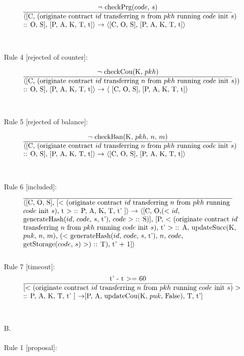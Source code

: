\documentclass[a4paper]{llncs}
\begin{document}
\begin{equation}{}
\frac{\text{$\neg$ checkPrg($code$, $s$)}}{\parbox{4.2in}{\text{$\langle$[C, (originate contract ${id}$ transferring  ${n}$ from ${pkh}$ running ${code}$ init ${s}$)} \text{:: O, S], [P, A, K, T, t]$\rangle$ $\rightarrow$ $\langle$[C, O, S],} \text{[P, A, K, T, t]$\rangle$}}} 
\end{equation}
\\
\\
Rule 4 [rejected of counter]:

\begin{equation}{}
\frac{\text{$\neg$ checkCou(K, $pkh$)}}{\parbox{4.2in}{\text{$\langle$[C, (originate contract ${id}$ transferring  ${n}$ from ${pkh}$ running ${code}$ init ${s}$))} \text{:: O, S], [P, A, K, T, t]$\rangle$ $\rightarrow$ $\langle$ [C, O, S],} \text{[P, A, K, T, t]$\rangle$}}} 
\end{equation}
\\
\\
Rule 5 [rejected of balance]:

\begin{equation}{}
\frac{\text{$\neg$ checkBan(K, $pkh$, $n$, $m$)}}{\parbox{4.2in}{\text{$\langle$[C, (originate contract ${id}$ transferring  ${n}$ from ${pkh}$ running ${code}$ init ${s}$)} \text{:: O, S], [P, A, K, T, t]$\rangle$ $\rightarrow$ $\langle$[C, O, S],} \text{[P, A, K, T, t]$\rangle$}}} 
\end{equation}
\\
\\
Rule 6 [included]:
\begin{equation}{}
\frac{}{\parbox{4.2in}{\text{$\langle$[C, O, S], [$<$ (originate contract ${id}$ transferring  ${n}$ from ${pkh}$ running } \\
\text{${code}$ init ${s}$), t $>$ :: P, A, K, T, t' ]$\rangle$ $\rightarrow$ $\langle$[C, O,($<$ $id$, } \\
\text{generateHash($id$, $code$, $s$, t'), $code$ $>$ :: S)], [P, $<$ (originate contract ${id}$ } \\
\text{transferring  ${n}$ from ${pkh}$ running ${code}$ init ${s}$), t' $>$ :: A, updateSucc(K, } \\
\text{$puk$, $n$, $m$), ($<$ generateHash($id$, $code$, $s$, t'), $n$, $code$, } \\
 \text{getStorage($code$, $s$) $>$) :: T), t' + 1]$\rangle$}}} 
\end{equation}
\\
Rule 7 [timeout]:
\begin{equation}{}
\frac{\text{t' - t $>=$ 60}}{\parbox{4.2in}{\text{[$<$ (originate contract ${id}$ transferring  ${n}$ from ${pkh}$ running ${code}$ init ${s}$) $>$ } \\
\text{:: P, A, K, T, t' ] $\rightarrow$[P, A, updateCou(K, $puk$, False), T, t']}}} 
\end{equation}
\\
\\
B. 
\\
\\
Rule 1 [proposal]:
\end{document}
